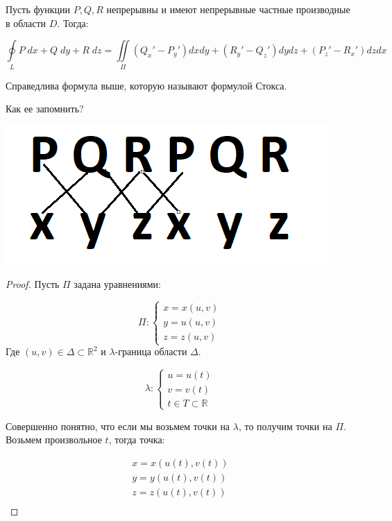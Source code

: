 \documentclass[../../main.tex]{subfiles}
\begin{document}
	\begin{theorem}
		Пусть функции $P,Q,R$ непрерывны и имеют непрерывные частные производные в области $D$. Тогда:
		
		\[ \oint \limits_L P \; dx + Q \; dy + R \; dz = \iint \limits_{\Pi} \left( Q_x' - P_y'\right)dxdy + \left( R_y' - Q_z'\right)dydz + \left( P_z' - R_x'\right)dzdx     \]
		
		Справедлива формула выше, которую называют формулой Стокса.
		
		Как ее запомнить?
		
		\begin{center}
			\includegraphics[scale = 0.6]{lec_25_PQR}
		\end{center}
		
		\begin{proof}
			Пусть $\Pi$ задана уравнениями:
			
			\[ \Pi : \begin{cases} 
			x = x\left( u,v\right) \\ 
			y = u\left( u,v\right) \\ 
			z = z\left( u,v\right)  
			\end{cases} \]
			Где $\left( u,v \right) \in \Delta \subset \mathbb{R}^2$ и $\lambda$-граница области $\Delta$.
			
			\[ \lambda : \begin{cases} 
			u = u \left( t \right)  \\ 
			v = v \left( t \right) \\ 
			t \in T \subset \mathbb{R}  
			\end{cases} \]
			
			Совершенно понятно, что если мы возьмем точки на $\lambda$, то получим точки на $\Pi$. Возьмем произвольное $t$, тогда точка:
			
			 \begin{gather*} x = x\left( u\left( t\right), v\left( t\right)   \right) \\
			 y = y\left( u\left( t\right), v\left( t\right)   \right) \\
			 z = z\left( u\left( t\right), v\left( t\right)   \right) \\
			 \end{gather*}
			 

\end{proof}
\end{theorem}
\end{document}
